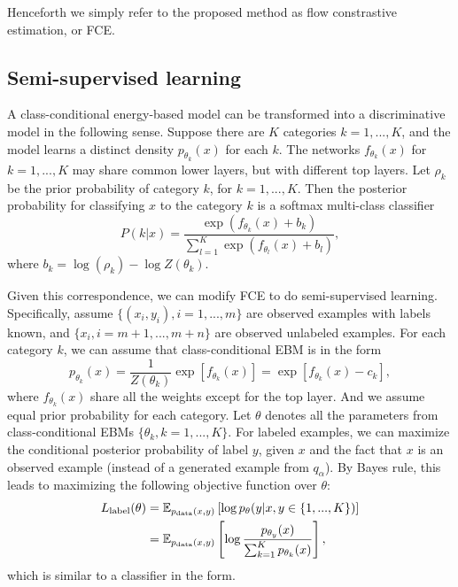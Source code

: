 \documentclass[10pt,twocolumn,letterpaper]{article}
\newcommand{\E}{\mathbb{E}}
\begin{document}
Henceforth we simply refer to the proposed method as flow constrastive estimation, or FCE. 

\subsection{Semi-supervised learning}
\label{sect: semi}
A class-conditional energy-based model can be transformed into a discriminative model in the following sense. Suppose there are $K$ categories $k = 1,..., K$, and the model learns a distinct density $p_{\theta_k}(x)$ for each $k$. The networks $f_{\theta_k}(x)$ for $k = 1,..., K$ may share common lower layers, but with different top layers. Let $\rho_k$ be the prior probability of category $k$, for $k = 1,..., K$. Then the posterior probability for classifying $x$ to the category $k$ is a softmax multi-class classifier
\begin{equation}
     P(k|x) = \frac{\exp(f_{\theta_k}(x) + b_k)}{\sum_{l=1}^K\exp(f_{\theta_l}(x) + b_l)},
     \label{model: cls}
\end{equation}
where $b_k =   \log(\rho_k) - \log Z(\theta_k)$. 



Given this correspondence, we can modify FCE to do semi-supervised learning. Specifically, assume $\{(x_i, y_i), i=1,...,m\}$ are observed examples with labels known, and $\{x_i, i = m+1,..., m+n\}$ are observed unlabeled examples. For each category $k$, we can assume that class-conditional EBM is in the form
\begin{equation}
p_{\theta_k}(x) = \frac{1}{Z(\theta_k)} \exp[f_{\theta_k}(x)] = \exp[f_{\theta_k}(x) - c_k],
\end{equation}  
where $f_{\theta_k}(x)$ share all the weights except for the top layer. And we assume equal prior probability for each category. Let $\theta$ denotes all the parameters from class-conditional EBMs $\{\theta_k, k = 1,..., K\}$. For labeled examples, we can maximize the conditional posterior probability of label $y$, given $x$ and the fact that $x$ is an observed example (instead of a generated example from $q_\alpha$). By Bayes rule, this leads to maximizing the following objective function over $\theta$:
\begin{equation}
\begin{split}
	L_{\rm label}(\theta)& = \E_{p_{\rm data}(x, y)}\left[\log p_\theta(y | x, y \in \{1, ..., K\}) \right] \\
	&= \E_{p_{\rm data}(x, y)}\left[ \log\frac{p_{\theta_y}(x)}{\sum_{k=1}^K p_{\theta_k}(x)} \right],
\end{split}
\label{eqn: label}
\end{equation}
which is similar to a classifier in the form. 
\end{document}
